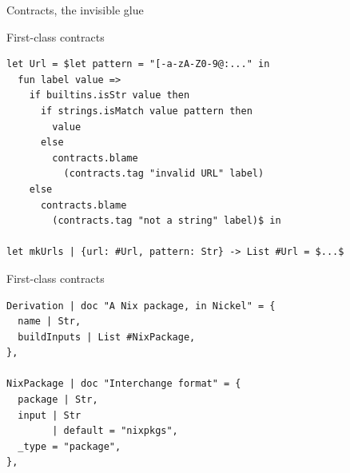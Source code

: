 \documentclass[aspectratio=169]{beamer}
\begin{document}
\begin{frame}{Contracts, the invisible glue}
\end{frame}

\begin{frame}[fragile]{First-class contracts}
\begin{lstlisting}[language=Nickel]
let Url = $let pattern = "[-a-zA-Z0-9@:..." in
  fun label value =>
    if builtins.isStr value then
      if strings.isMatch value pattern then
        value
      else
        contracts.blame
          (contracts.tag "invalid URL" label)
    else
      contracts.blame
        (contracts.tag "not a string" label)$ in

let mkUrls | {url: #Url, pattern: Str} -> List #Url = $...$
\end{lstlisting}
\end{frame}

\begin{frame}[fragile]{First-class contracts}
\begin{lstlisting}[language=Nickel]
Derivation | doc "A Nix package, in Nickel" = {
  name | Str,
  buildInputs | List #NixPackage,
},

NixPackage | doc "Interchange format" = {
  package | Str,
  input | Str
        | default = "nixpkgs",
  _type = "package",
},
\end{lstlisting}
\end{frame}

%
\end{document}
